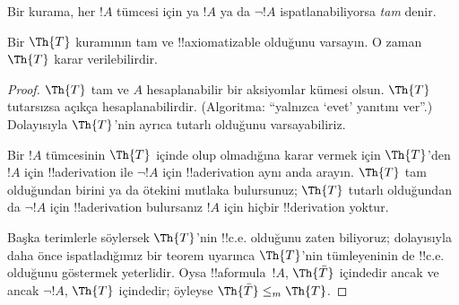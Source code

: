 



Bir kurama, her $!A$ tümcesi için ya $!A$ ya da $\lnot !A$
ispatlanabiliyorsa {\em tam} denir.

\begin{lem}
Bir $\Th{T}$ kuramının tam ve !!{axiomatizable} olduğunu varsayın. O zaman
$\Th{T}$ karar verilebilirdir.
\end{lem}

\begin{proof}
$\Th{T}$ tam ve $A$ hesaplanabilir bir aksiyomlar kümesi olsun. $\Th{T}$
tutarsızsa açıkça hesaplanabilirdir. (Algoritma: “yalnızca ‘evet’ yanıtını
ver”.)
Dolayısıyla $\Th{T}$'nin ayrıca tutarlı olduğunu varsayabiliriz.

Bir $!A$ tümcesinin $\Th{T}$ içinde olup olmadığına karar vermek için
$\Th{T}$'den $!A$ için !!a{derivation} ile $\lnot !A$ için
!!a{derivation} aynı anda arayın. $\Th{T}$ tam olduğundan birini ya da
ötekini mutlaka bulursunuz; $\Th{T}$ tutarlı olduğundan da $\lnot !A$ için
!!a{derivation} bulursanız $!A$ için hiçbir !!{derivation} yoktur.

Başka terimlerle söylersek $\Th{T}$'nin !!{c.e.} olduğunu zaten biliyoruz;
dolayısıyla daha önce ispatladığımız bir teorem uyarınca
$\Th{T}$'nin tümleyeninin de !!{c.e.} olduğunu göstermek yeterlidir. Oysa
!!a{formula}~$!A$, $\Th{\bar T}$ içindedir ancak ve ancak $\lnot !A$,
$\Th{T}$ içindedir; öyleyse
$\Th{\bar T} \leq_m \Th{T}$.
\end{proof}

